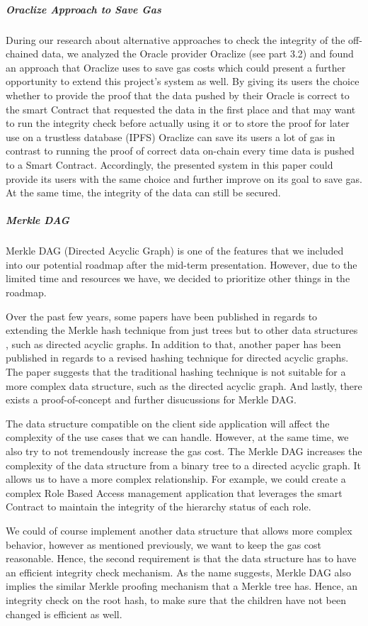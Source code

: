 \subparagraph{Oraclize Approach to Save Gas}
During our research about alternative approaches to check the integrity of the off-chained data, we analyzed the Oracle provider Oraclize (see part 3.2) and found an approach that Oraclize uses to save gas costs which could present a further opportunity to extend this project’s system as well. By giving its users the choice whether to provide the proof that the data pushed by their Oracle is correct to the smart Contract that requested the data in the first place and that may want to run the integrity check before actually using it or to store the proof for later use on a trustless database (IPFS) Oraclize can save its users a lot of gas in contrast to running the proof of correct data on-chain every time data is pushed to a Smart Contract. Accordingly, the presented system in this paper could provide its users with the same choice and further improve on its goal to save gas. At the same time, the integrity of the data can still be secured.

\subparagraph{Merkle DAG}
Merkle DAG (Directed Acyclic Graph) is one of the features that we included into our potential roadmap after the mid-term presentation. However, due to the limited time and resources we have, we decided to prioritize other things in the roadmap.

Over the past few years, some papers have been published in regards to extending the Merkle hash technique from just trees but to other data structures \cite{Martel2004}, such as directed acyclic graphs. In addition to that, another paper has been published in regards to a revised hashing technique \cite{kundu2012hashing} for directed acyclic graphs. The paper suggests that the traditional hashing technique is not suitable for a more complex data structure, such as the directed acyclic graph. And lastly, there exists a proof-of-concept \cite{futureWork02} and further disucussions for Merkle DAG. 

The data structure compatible on the client side application will affect the complexity of the use cases that we can handle. However, at the same time, we also try to not tremendously increase the gas cost. The Merkle DAG increases the complexity of the data structure from a binary tree to a directed acyclic graph. It allows us to have a more complex relationship. For example, we could create a complex Role Based Access management application that leverages the smart Contract to maintain the integrity of the hierarchy status of each role.

We could of course implement another data structure that allows more complex behavior, however as mentioned previously, we want to keep the gas cost reasonable. Hence, the second requirement is that the data structure has to have an efficient integrity check mechanism. As the name suggests, Merkle DAG also implies the similar Merkle proofing mechanism that a Merkle tree has. Hence, an integrity check on the root hash, to make sure that the children have not been changed is efficient as well.

